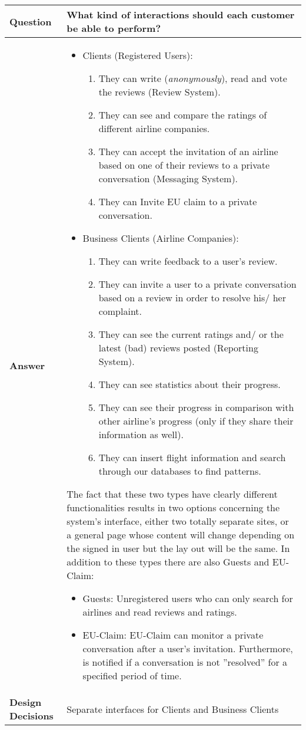 \clearpage
\begin{longtable}{| l |  p{12cm} |}
\hline
\textbf{Question} & \textbf{What kind of interactions should each customer be able to perform?} \\ \hline
\textbf{Answer} &\begin{itemize}
\item Clients (Registered Users):
	\begin{enumerate}
		\item They can write ({\em anonymously}), read and vote the reviews (Review System).
       		 \item They can see and compare the ratings of different airline companies.
        	\item They can accept the invitation of an airline based on one of their reviews to a private conversation (Messaging System). 
		\item They can Invite EU claim to a private conversation.
	\end{enumerate}
\item Business Clients (Airline Companies):
	\begin{enumerate}
		\item They can write feedback to a user's review.
		\item They can invite a user to a private conversation based on a review in order to resolve his/ her complaint.
		\item They can see the current ratings and/ or the latest (bad) reviews posted (Reporting System).
		\item They can see statistics about their progress.
		\item They can see their progress in comparison with other airline's progress (only if they share their information as well).
		\item They can insert flight information and search through our databases to find patterns.
	\end{enumerate}
\end{itemize} 
The fact that these two types have clearly different functionalities results in two options concerning the system's interface, either two totally separate sites, or a general page whose content will change depending on the signed in user but the lay out will be the same.
In addition to these types there are also Guests and EU-Claim:
	\begin{itemize}
 	\item Guests: Unregistered users who can only search for airlines and read reviews and ratings.
 	\item EU-Claim: EU-Claim can monitor a private conversation after a user's invitation. Furthermore, is notified if a conversation is not ''resolved'' for a specified period of time.
	\end{itemize}
\\ \hline
\textbf{Design Decisions} & Separate interfaces for Clients and Business Clients \\ \hline
\end{longtable}


